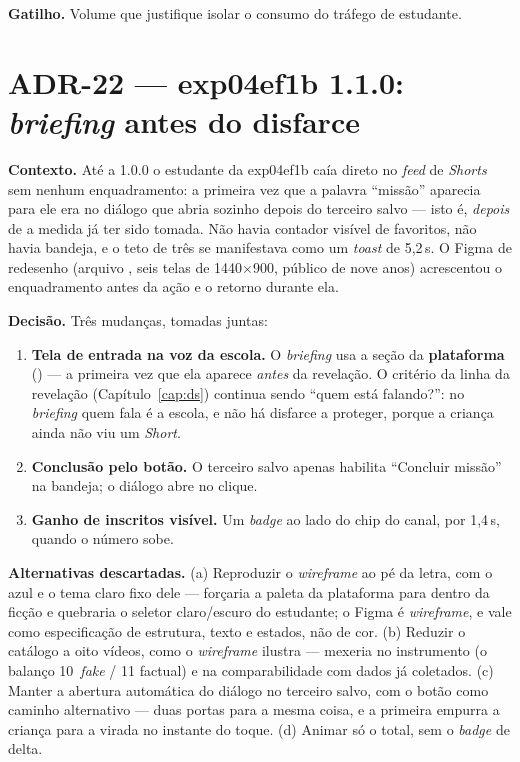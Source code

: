 \textbf{Gatilho.} Volume que justifique isolar o consumo do tráfego de estudante.


\section{ADR-22 --- exp04ef1b 1.1.0: \emph{briefing} antes do disfarce}

\textbf{Contexto.} Até a 1.0.0 o estudante da exp04ef1b caía direto no \emph{feed} de
\emph{Shorts} sem nenhum enquadramento: a primeira vez que a palavra
\enquote{missão} aparecia para ele era no diálogo que abria sozinho depois do
terceiro salvo --- isto é, \emph{depois} de a medida já ter sido tomada. Não havia
contador visível de favoritos, não havia bandeja, e o teto de três se manifestava
como um \emph{toast} de 5,2\,s. O Figma de redesenho (arquivo
, seis telas de 1440$\times$900, público de nove anos)
acrescentou o enquadramento antes da ação e o retorno durante ela.

\textbf{Decisão.} Três mudanças, tomadas juntas:

\begin{enumerate}
  \item \textbf{Tela de entrada na voz da escola.} O \emph{briefing} usa a seção
    da \textbf{plataforma} () --- a primeira vez que ela aparece
    \emph{antes} da revelação. O critério da linha da revelação
    (Capítulo~\ref{cap:ds}) continua sendo \enquote{quem está falando?}: no
    \emph{briefing} quem fala é a escola, e não há disfarce a proteger, porque a
    criança ainda não viu um \emph{Short}.
  \item \textbf{Conclusão pelo botão.} O terceiro salvo apenas habilita
    \enquote{Concluir missão} na bandeja; o diálogo abre no clique.
  \item \textbf{Ganho de inscritos visível.} Um \emph{badge}  ao lado do
    chip do canal, por 1,4\,s, quando o número sobe.
\end{enumerate}

\textbf{Alternativas descartadas.} (a) Reproduzir o \emph{wireframe} ao pé da
letra, com o azul e o tema claro fixo dele --- forçaria a paleta da plataforma
para dentro da ficção e quebraria o seletor claro/escuro do estudante; o Figma é
\emph{wireframe}, e vale como especificação de estrutura, texto e estados, não de
cor. (b) Reduzir o catálogo a oito vídeos, como o \emph{wireframe} ilustra ---
mexeria no instrumento (o balanço 10~\emph{fake} / 11 factual) e na
comparabilidade com dados já coletados. (c) Manter a abertura automática do
diálogo no terceiro salvo, com o botão como caminho alternativo --- duas portas
para a mesma coisa, e a primeira empurra a criança para a virada no instante do
toque. (d) Animar só o total, sem o \emph{badge} de delta.

